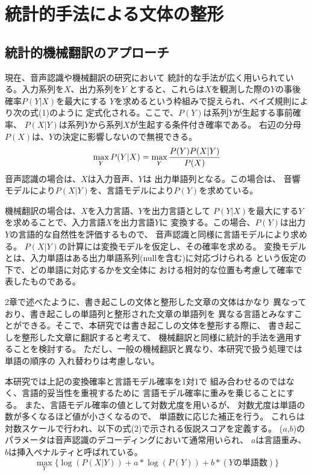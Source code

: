 \section{統計的手法による文体の整形}

\subsection{統計的機械翻訳のアプローチ}

現在、音声認識や機械翻訳の研究において
統計的な手法が広く用いられている。入力系列を$X$、出力系列を$Y$
とすると、これらは$X$を観測した際の$Y$の事後確率$P(Y|X)$を最大にする
$Y$を求めるという枠組みで捉えられ、ベイズ規則により次の式(1)のように
定式化される。ここで、$P(Y)$は系列$Y$が生起する事前確率、
$P(X|Y)$は系列$Y$から系列$X$が生起する条件付き確率である。
右辺の分母$P(X)$は、$Y$の決定に影響しないので無視できる。
\begin{equation}
\max_{Y}P(Y|X) = \max_{Y}{P(Y)P(X|Y)\over P(X)}
\end{equation}
音声認識\cite{text2}の場合は、$X$は入力音声、$Y$は
出力単語列となる。この場合は、
音響モデルにより$P(X|Y)$を、言語モデルにより$P(Y)$を求めている。

機械翻訳\cite{Brown,ICSLP98-209,ICSLP98-826}の場合は、$X$を入力言語、$Y$を出力言語として
$P(Y|X)$を最大にする$Y$を求めることで、入力言語$X$を出力言語$Y$に
変換する。この場合、$P(Y)$は出力$Y$の言語的な自然性を評価するもので、
音声認識と同様に言語モデルにより求める。
$P(X|Y)$の計算には変換モデルを仮定し、その確率を求める。
変換モデルとは、入力単語はある出力単語系列(nullを含む)に対応づけられる
という仮定の下で、どの単語に対応するかを文全体に
おける相対的な位置も考慮して確率で表したものである。

2章で述べたように、書き起こしの文体と整形した文章の文体はかなり
異なっており、書き起こしの単語列と整形された文章の単語列を
異なる言語とみなすことができる。そこで、本研究では書き起こしの文体を整形する際に、
書き起こしを整形した文章に翻訳すると考えて、
機械翻訳と同様に統計的手法を適用することを検討する。
ただし、一般の機械翻訳と異なり、本研究で扱う処理では単語の順序の
入れ替わりは考慮しない。

本研究では上記の変換確率と言語モデル確率を1対1で
組み合わせるのではなく、言語的妥当性を重視するために
言語モデル確率に重みを乗じることにする。
また、言語モデル確率の値として対数尤度を用いるが、
対数尤度は単語の数が多くなるほど値が小さくなるので、
単語数に応じた補正を行う。
これらは対数スケールで行われ、以下の式(2)で示される仮説スコアを定義する。
($a$,$b$)のパラメータは音声認識のデコーディングにおいて通常用いられ、
$a$は言語重み、$b$は挿入ペナルティと呼ばれている。
\begin{equation}
\max_{Y}\{\log(P(X|Y))+a*\log(P(Y))+b*(Yの単語数)\}
\end{equation}

